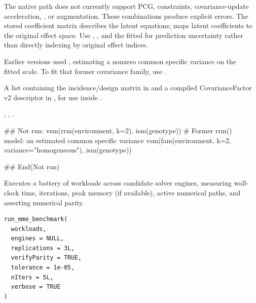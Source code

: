 \documentclass[a4paper]{book}
\begin{document}
\begin{Details}
The native path does not currently support PCG,  constraints,
covariance-update acceleration, , or
 augmentation. These combinations
produce explicit errors.
The stored coefficient matrix  describes the latent equations;
 maps latent coefficients to the original effect space.
Use , , and the fitted  for
prediction uncertainty rather than directly indexing  by original
effect indices.

Earlier versions used , estimating a
nonzero common specific variance on the fitted scale. To fit that former
covariance family, use .
\end{Details}
%
\begin{Value}
A list containing the incidence/design matrix in  and a compiled CovarianceFactor v2 descriptor in , for use inside .
\end{Value}
%
\begin{SeeAlso}\relax
{}, , .
\end{SeeAlso}
%
\begin{Examples}
\begin{ExampleCode}
## Not run: 
vsm(rrm(environment, k=2), ism(genotype))
# Former rrm() model: an estimated common specific variance
vsm(fam(environment, k=2, variance="homogeneous"), ism(genotype))

## End(Not run)
\end{ExampleCode}
\end{Examples}
%
\begin{Description}\relax
Executes a battery of workloads across candidate solver engines, measuring wall-clock time,
iterations, peak memory (if available), active numerical paths, and asserting numerical parity.
\end{Description}
%
\begin{Usage}
\begin{verbatim}
run_mme_benchmark(
  workloads,
  engines = NULL,
  replications = 3L,
  verifyParity = TRUE,
  tolerance = 1e-05,
  nIters = 5L,
  verbose = TRUE
)
\end{verbatim}
\end{Usage}
%
\end{document}
